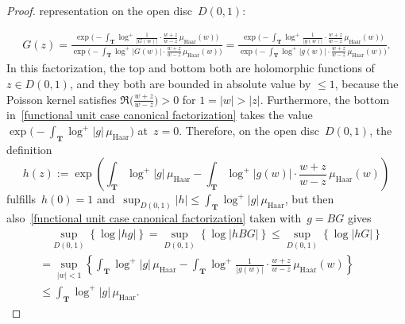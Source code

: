 \documentclass[10pt]{amsart}
\def\T{\mathbf{T}}
\theoremstyle{remark}
\numberwithin{equation}{subsection}
\def\numequation{\addtocounter{subsubsection}{1}\begin{equation}}
\begin{document}
\begin{proof}
 representation on the open disc~$D(0,1)$: 
\numequation \label{functional unit case canonical factorization} 
\begin{aligned}
G(z) = \frac{  \exp \Big(  -  \int_{\T} \log^+{ \frac{1}{|G(w)|} } \cdot \frac{w+z}{w-z} \, \mu_{\mathrm{Haar}}(w) \Big) }{
 \exp \Big(  -  \int_{\T} \log^+{ |G(w)| } \cdot \frac{w+z}{w-z}  \, \mu_{\mathrm{Haar}}(w) \Big) }
  =  \frac{  \exp \Big(  -  \int_{\T} \log^+{ \frac{1}{|g(w)|} } \cdot \frac{w+z}{w-z} \, \mu_{\mathrm{Haar}}(w) \Big) }{
 \exp \Big(  -  \int_{\T} \log^+{ |g(w)| } \cdot \frac{w+z}{w-z}  \, \mu_{\mathrm{Haar}}(w) \Big) }. 
 \end{aligned}
\end{equation}
In this factorization, the top and bottom both are holomorphic functions of $z \in D(0,1)$, and they both are bounded in absolute value by $\leq 1$, because the Poisson kernel satisfies $\Re\Big( \frac{w+z}{w-z} \Big) > 0$ for $1 = |w| > |z|$. Furthermore, the bottom in~\eqref{functional unit case canonical factorization} takes the value $ \exp \Big( -  \int_{\T} \log^+{|g|} \, \mu_{\mathrm{Haar}} \Big)$ at~$z = 0$. Therefore, on the open disc~$D(0,1)$, the definition 
$$
h(z) := \exp\left( \int_{\T} \log^+{|g|} \, \mu_{\mathrm{Haar}}    -   \int_{\T} \log^+{ |g (w)| } \cdot \frac{w+z}{w-z}  \, \mu_{\mathrm{Haar}}(w)  \right)
$$
fulfills~$h(0) = 1$ and~$\sup_{D(0,1)} |h| \leq  \int_{\T} \log^+{|g|} \, \mu_{\mathrm{Haar}}$, 
but then also~\eqref{functional unit case canonical factorization} taken with~$g = BG$ gives 
\begin{equation*}
\begin{aligned}
& \quad
\sup_{D(0,1)} \left\{ \log{ |hg|}  \right\} = \sup_{D(0,1)} \left\{ \log{ |hBG|} \right\}  \leq \sup_{D(0,1)} \left\{ \log{  |hG| } \right\} \\
&  = \sup_{|w| < 1} \left\{ \int_{\T} \log^+{|g|} \, \mu_{\mathrm{Haar}}    -    \int_{\T} \log^+{ \frac{1}{|g(w)|} } \cdot \frac{w+z}{w-z} \, \mu_{\mathrm{Haar}}(w) \right\} \\
& \leq  \int_{\T} \log^+{|g|} \, \mu_{\mathrm{Haar}}.
\end{aligned}
\end{equation*}


\end{proof}
\end{document}
